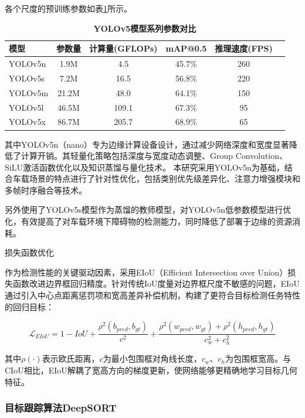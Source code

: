 \documentclass[a4paper, UTF8, fontsize=12pt]{ctexart} %
\numberwithin{equation}{section} %
\begin{document}
\begin{parlist}
各个尺度的预训练参数如表\ref{tab:yolov5-params}所示。
\begin{table}[H]
\centering
\caption{\textbf{YOLOv5模型系列参数对比 \cite{ultralytics2023}}}
\label{tab:yolov5-params}
\begin{tabular}{lccccc}
\hline
\textbf{模型} & \textbf{参数量} & \textbf{计算量(GFLOPs)} & \textbf{mAP@0.5} & \textbf{推理速度(FPS)} \\
\hline
YOLOv5n & 1.9M & 4.5 & 45.7\% & 260 \\
YOLOv5s & 7.2M & 16.5 & 56.8\% & 220 \\
YOLOv5m & 21.2M & 48.0 & 64.1\% & 150 \\
YOLOv5l & 46.5M & 109.1 & 67.3\% & 95 \\
YOLOv5x & 86.7M & 205.7 & 68.9\% & 65 \\
\hline
\end{tabular}
\end{table}

其中YOLOv5n（nano）专为边缘计算设备设计，通过减少网络深度和宽度显著降低了计算开销。其轻量化策略包括深度与宽度动态调整、Group Convolution、SiLU激活函数优化以及知识蒸馏与量化技术。
本研究采用YOLOv5n为基础，结合车载场景的特点进行了针对性优化，包括类别优先级差异化、注意力增强模块和多帧时序融合等技术。

另外使用了YOLOv5s模型作为蒸馏的教师模型，对YOLOv5n低参数模型进行优化，有效提高了对车载环境下障碍物的检测能力，同时降低了部署于边缘的资源消耗。
\item 损失函数优化

作为检测性能的关键驱动因素，采用EIoU（Efficient Intersection over Union）损失函数改进边界框回归精度。针对传统IoU度量对边界框尺度不敏感的问题，EIoU通过引入中心点距离惩罚项和宽高差异补偿机制，构建了更符合目标检测任务特性的回归目标：

\begin{equation}
\mathcal{L}_{EIoU} = 1 - IoU + \frac{\rho^2(b_{pred},b_{gt})}{c^2} + \frac{\rho^2(w_{pred},w_{gt}) + \rho^2(h_{pred},h_{gt})}{c_w^2 + c_h^2}
\end{equation}

其中$\rho(\cdot)$表示欧氏距离，$c$为最小包围框对角线长度，$c_w$、$c_h$为包围框宽高。与CIoU相比，EIoU解耦了宽高方向的梯度更新，使网络能够更精确地学习目标几何特征。
\end{parlist}


\subsubsection{目标跟踪算法DeepSORT}
\end{document}
